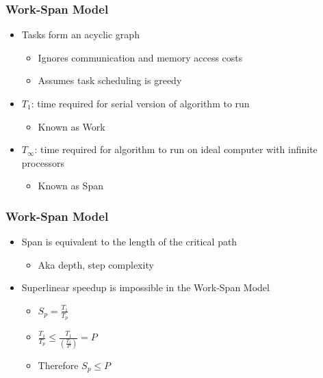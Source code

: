 \documentclass{beamer}
\begin{document}
\begin{frame}[fragile]
	\frametitle{Work-Span Model}
\begin{itemize}
\item Tasks form an acyclic graph
	\begin{itemize}
	\item Ignores communication and memory access costs
	\item Assumes task scheduling is greedy
	\end{itemize}
\item $T_{1}$: time required for serial version of algorithm to run
	\begin{itemize}
	\item Known as Work
	\end{itemize}
\item $T_{\infty}$: time required for algorithm to run on ideal computer with infinite processors
	\begin{itemize}
	\item Known as Span
	\end{itemize}
\end{itemize}
\end{frame}

\begin{frame}[fragile]
	\frametitle{Work-Span Model}
\begin{itemize}
\item Span is equivalent to the length of the critical path 
	\begin{itemize}
	\item Aka depth, step complexity
	\end{itemize}
\item Superlinear speedup is impossible in the Work-Span Model
	\begin{itemize}
	\item $S_{p}=\frac{T_{1}}{T_{p}}$
	\item $\frac{T_{1}}{T_{p}} \leq \frac{T_{1}}{(\frac{T_{1}}{P})} = P$
	\item Therefore $S_{p}\leq P$
	\end{itemize}
\end{itemize}
\end{frame}
\end{document}
